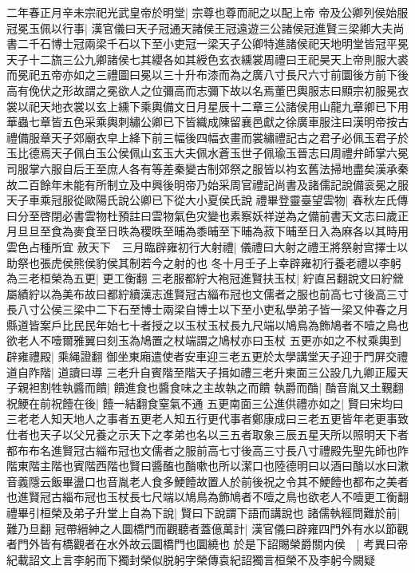 二年春正月辛未宗祀光武皇帝於明堂|{
	宗尊也尊而祀之以配上帝}
帝及公卿列侯始服冠冕玉佩以行事|{
	漢官儀曰天子冠通天諸侯王冠遠遊三公諸侯冠進賢三梁卿大夫尚書二千石博士冠兩梁千石以下至小吏冠一梁天子公卿特進諸侯祀天地明堂皆冠平冕天子十二旒三公九卿諸侯七其纓各如其綬色玄衣纁裳周禮曰王祀昊天上帝則服大裘而冕祀五帝亦如之三禮圖曰冕以三十升布漆而為之廣八寸長尺六寸前圜後方前下後高有俛伏之形故謂之冕欲人之位彌高而志彌下故以名焉董巴輿服志曰顯宗初服冕衣裳以祀天地衣裳以玄上纁下乘輿備文日月星辰十二章三公諸侯用山龍九章卿已下用華蟲七章皆五色采乘輿刺繡公卿已下皆織成陳留襄邑獻之徐廣車服注曰漢明帝按古禮備服章天子郊廟衣皁上絳下前三幅後四幅衣畫而裳繡禮記古之君子必佩玉君子於玉比德焉天子佩白玉公侯佩山玄玉大夫佩水蒼玉世子佩瑜玉晉志曰周禮弁師掌六冕司服掌六服自后王至庶人各有等差秦變古制郊祭之服皆以袀玄舊法掃地盡矣漢承秦故二百餘年未能有所制立及中興後明帝乃始采周官禮記尚書及諸儒記說備衮冕之服天子車乘冠服從歐陽氏說公卿已下從大小夏侯氏說}
禮畢登靈臺望雲物|{
	春秋左氏傳曰分至啓閉必書雲物杜預註曰雲物氣色灾變也素察妖祥逆為之備前書天文志曰歲正月旦旦至食為麥食至日昳為稷昳至晡為黍晡至下晡為菽下晡至日入為麻各以其時用雲色占種所宜}
赦天下　三月臨辟雍初行大射禮|{
	儀禮曰大射之禮王將祭射宫擇士以助祭也張虎侯熊侯豹侯其制若今之射的也}
冬十月壬子上幸辟雍初行養老禮以李躬為三老桓榮為五更|{
	更工衡翻}
三老服都紵大袍冠進賢扶玉杖|{
	紵直呂翻說文曰紵檾屬績紵以為美布故曰都紵續漢志進賢冠古緇布冠也文儒者之服也前高七寸後高三寸長八寸公侯三梁中二下石至博士兩梁自博士以下至小吏私學弟子皆一梁又仲春之月縣道皆案戶比民民年始七十者授之以玉杖玉杖長九尺端以鳩鳥為飾鳩者不噎之鳥也欲老人不噎爾雅翼曰刻玉為鳩置之杖端謂之鳩杖亦曰玉杖}
五更亦如之不杖乘輿到辟雍禮殿|{
	乘䋲證翻}
御坐東廂遣使者安車迎三老五更於太學講堂天子迎于門屏交禮道自阼階|{
	道讀曰導}
三老升自賓階至階天子揖如禮三老升東面三公設几九卿正履天子親袒割牲執醬而饋|{
	饋進食也醬食味之主故執之而饋}
執爵而酳|{
	酳音胤又土覲翻}
祝鯁在前祝饐在後|{
	饐一結翻食窒氣不通}
五更南面三公進供禮亦如之|{
	賢曰宋均曰三老老人知天地人之事者五更老人知五行更代事者鄭康成曰三老五更皆年老更事致仕者也天子以父兄養之示天下之孝弟也名以三五者取象三辰五星天所以照明天下者都布布名進賢冠古緇布冠也文儒者之服前高七寸後高三寸長八寸禮殿先聖先師也阼階東階主階也賓階西階也賢曰醬醢也酳嗽也所以潔口也陸德明曰以酒曰酳以水曰漱音義隱云飯畢盪口也音胤老人食多鯁饐故置人於前後祝之令其不鯁饐也都布之美者也進賢冠古緇布冠也玉杖長七尺端以鳩鳥為飾鳩者不噎之鳥也欲老人不噎更工衡翻}
禮畢引桓榮及弟子升堂上自為下說|{
	賢曰下說謂下語而講說也}
諸儒執經問難於前|{
	難乃旦翻}
冠帶縉紳之人圜橋門而觀聽者蓋億萬計|{
	漢官儀曰辟雍四門外有水以節觀者門外皆有橋觀者在水外故云圜橋門也圜繞也}
於是下詔賜榮爵關内侯　|{
	考異曰帝紀載詔文上言李躬而下獨封榮似脱躬字榮傳袁紀詔獨言桓榮不及李躬今闕疑}
